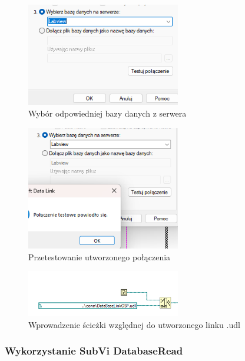 \documentclass{report}
\begin{document}
\begin{figure}[H]
    \centering
    \includegraphics[width=0.6\textwidth]{src/Database/Stage5.png}
    \caption{Wybór odpowiedniej bazy danych z serwera}
    \label{fig:first-att}
\end{figure}

\begin{figure}[H]
    \centering
    \includegraphics[width=0.6\textwidth]{src/Database/Stage6.png}
    \caption{Przetestowanie utworzonego połączenia}
    \label{fig:first-att}
\end{figure}

\begin{figure}[H]
    \centering
    \includegraphics[width=0.6\textwidth]{src/Database/Stage7.png}
    \caption{Wprowadzenie ścieżki względnej do utworzonego linku .udl}
    \label{fig:first-att}
\end{figure}



\newpage
\subsubsection{\large Wykorzystanie SubVi DatabaseRead}
\end{document}
